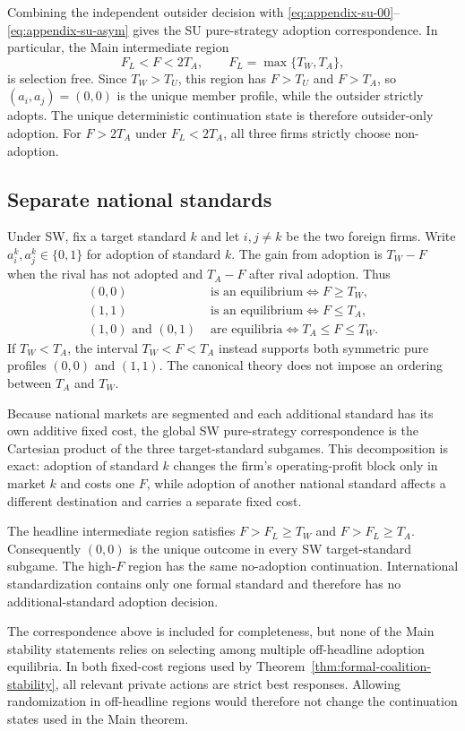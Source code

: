 Combining the independent outsider decision with \eqref{eq:appendix-su-00}--\eqref{eq:appendix-su-asym} gives the SU pure-strategy adoption correspondence. In particular, the Main intermediate region
\[
F_L<F<2T_A,
\qquad F_L=\max\{T_W,T_A\},
\]
is selection free. Since $T_W>T_U$, this region has $F>T_U$ and $F>T_A$, so $(a_i,a_j)=(0,0)$ is the unique member profile, while the outsider strictly adopts. The unique deterministic continuation state is therefore outsider-only adoption. For $F>2T_A$ under $F_L<2T_A$, all three firms strictly choose non-adoption.

\subsection{Separate national standards}

Under SW, fix a target standard $k$ and let $i,j\ne k$ be the two foreign firms. Write $a_i^k,a_j^k\in\{0,1\}$ for adoption of standard $k$. The gain from adoption is $T_W-F$ when the rival has not adopted and $T_A-F$ after rival adoption. Thus
\begin{align}
(0,0)&\text{ is an equilibrium}\iff F\ge T_W,\label{eq:appendix-sw-00}\\
(1,1)&\text{ is an equilibrium}\iff F\le T_A,\label{eq:appendix-sw-11}\\
(1,0)\text{ and }(0,1)&\text{ are equilibria}\iff T_A\le F\le T_W.\label{eq:appendix-sw-asym}
\end{align}
If $T_W<T_A$, the interval $T_W<F<T_A$ instead supports both symmetric pure profiles $(0,0)$ and $(1,1)$. The canonical theory does not impose an ordering between $T_A$ and $T_W$.

Because national markets are segmented and each additional standard has its own additive fixed cost, the global SW pure-strategy correspondence is the Cartesian product of the three target-standard subgames. This decomposition is exact: adoption of standard $k$ changes the firm's operating-profit block only in market $k$ and costs one $F$, while adoption of another national standard affects a different destination and carries a separate fixed cost.

The headline intermediate region satisfies $F>F_L\ge T_W$ and $F>F_L\ge T_A$. Consequently $(0,0)$ is the unique outcome in every SW target-standard subgame. The high-$F$ region has the same no-adoption continuation. International standardization contains only one formal standard and therefore has no additional-standard adoption decision.

The correspondence above is included for completeness, but none of the Main stability statements relies on selecting among multiple off-headline adoption equilibria. In both fixed-cost regions used by Theorem~\ref{thm:formal-coalition-stability}, all relevant private actions are strict best responses. Allowing randomization in off-headline regions would therefore not change the continuation states used in the Main theorem.
